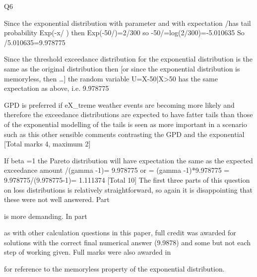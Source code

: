 \documentclass[a4paper,12pt]{article}
\begin{document}
Q6
\item  
Since the exponential distribution with parameter \lambda and with expectation /\lambda has tail probability
Exp(-x/ \mu ) then 
Exp(-50/\mu)=2/300 so
-50/\mu =log(2/300)=-5.010635 
So
/5.010635=9.978775 
\item   Since the threshold exceedance distribution for the exponential distribution is the same as the original distribution then 
[or since the exponential distribution is memoryless, then …]
the random variable U=X-50|X>50 has the same expectation as above, i.e. 9.978775 
\item  GPD is preferred if eX_{t}reme weather events are becoming more likely 
and therefore the exceedance distributions are expected to have fatter tails than
those of the exponential 
modelling of the tails is seen as more important in a scenario such as this 
other sensible comments contrasting the GPD and the exponential 
[Total marks 4, maximum 2]
\item 
If beta =1 the Pareto distribution will have expectation the same as the expected exceedance amount
\gamma /(gamma -1)= 9.978775 
or
\gamma = (gamma -1)*9.978775 
\gamma= 9.978775/(9.978775-1)= 1.111374 
[Total 10]
The first three parts of this question on loss distributions is relatively straightforward, so again it is disappointing that these were not well answered.
Part \item  is more demanding.
\medskip 
In part \item   as with other calculation questions in this paper, full credit was awarded for solutions with the correct final numerical answer (9.9878) and some but not each step of working given.
Full marks were also awarded in \item   for reference to the memoryless property of the exponential distribution.
\end{document}
